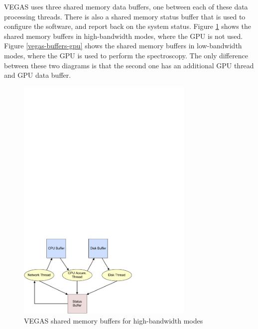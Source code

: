 \documentclass[11pt]{article} %
\begin{document}
VEGAS uses three shared memory data buffers, one between each of these data processing threads. There is also a shared memory status  buffer that is used to configure the software, and report back on the system status. Figure \ref{vegas-buffers-nogpu} shows the shared memory buffers in high-bandwidth modes, where the GPU is not used. Figure \ref{vegas-buffers-gpu} shows the shared memory buffers in low-bandwidth modes, where the GPU is used to perform the spectroscopy. The only difference between these two diagrams is that the second one has an additional GPU thread and GPU data buffer.

\begin{figure}[!h]
\centering
\includegraphics*[width=8.5cm, viewport = 0 0 420 280]{figures/vegas-buffers-nogpu.pdf}
\caption{VEGAS shared memory buffers for high-bandwidth modes}
\label{vegas-buffers-nogpu}
\end{figure}
\end{document}
